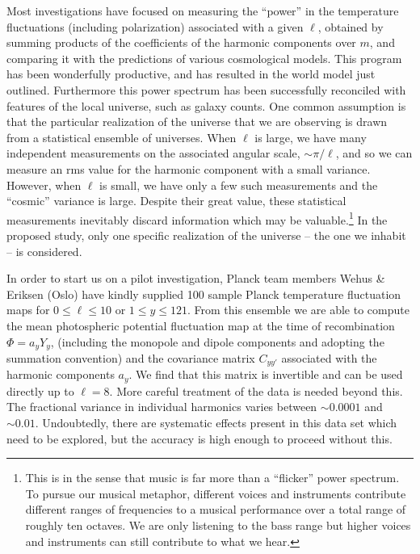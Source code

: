 \documentclass[psfig,11pt]{article}
\begin{document}
Most investigations have focused on measuring the ``power'' in the temperature fluctuations (including polarization) associated with a given $\ell$, obtained by summing products of the coefficients of the harmonic components over $m$, and comparing it with the predictions of various cosmological models. This program has been wonderfully productive, and has resulted in the world model just outlined. Furthermore this power spectrum has been successfully reconciled with features of the local universe, such as galaxy counts. One common assumption is that the particular realization of the universe that we are observing is drawn from a statistical ensemble of universes. When $\ell$ is large, we have many independent measurements on the associated angular scale, $\sim\pi/\ell$, and so we can measure an rms value for the harmonic component with a small variance. However, when $\ell$ is small, we have only a few such measurements and the ``cosmic'' variance is large. Despite their great value, these statistical measurements inevitably discard information which may be valuable.\footnote{This is in the sense that music is far more than a ``flicker'' power spectrum. To pursue our musical metaphor, different voices and instruments contribute different ranges of frequencies to a musical performance over a total range of roughly ten octaves. We are only listening to the bass range but higher voices and instruments can still contribute to what we hear.}  In the proposed study, only one specific realization of the universe -- the one we inhabit --  is considered.

In order to start us on a pilot investigation, Planck team members Wehus \& Eriksen  (Oslo) have kindly supplied 100 sample Planck temperature fluctuation maps for $0\le\ell\le10$ or $1\le y\le121$. From this ensemble we are able to compute the mean photospheric potential fluctuation map at the time of recombination $\Phi=a_yY_y$, (including the monopole and dipole components and adopting the summation convention) and the covariance matrix $C_{yy'}$ associated with the harmonic components $a_y$. We find that this matrix is invertible and can be used directly up to $\ell=8$. More careful treatment of the data is needed beyond this. The fractional variance in individual harmonics varies between $\sim0.0001$ and $\sim0.01$. Undoubtedly, there are systematic effects present in this data set which need to be explored, but the accuracy is high enough to proceed without this.
\end{document}
